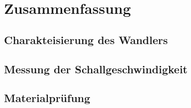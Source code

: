 \chapter{Zusammenfassung} \label{Zusammenfassung}

\section{Charakteisierung des Wandlers}




\section{Messung der Schallgeschwindigkeit} 





\section{Materialprüfung}
